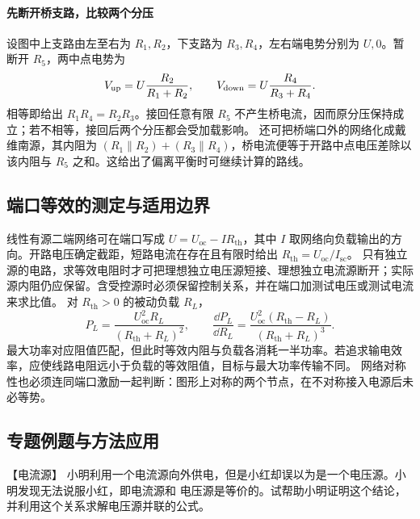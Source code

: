 {\par\noindent\begin{minipage}{\linewidth}
\bridgeFigure
{}
\end{minipage}\par\medskip


\paragraph{先断开桥支路，比较两个分压}
设图中上支路由左至右为 $R_1,R_2$，下支路为 $R_3,R_4$，左右端电势分别为 $U,0$。暂断开 $R_5$，两中点电势为
\[
 V_{\rm up}=U\frac{R_2}{R_1+R_2},\qquad
 V_{\rm down}=U\frac{R_4}{R_3+R_4}.
\]
相等即给出 $R_1R_4=R_2R_3$。接回任意有限 $R_5$ 不产生桥电流，因而原分压保持成立；若不相等，接回后两个分压都会受加载影响。
还可把桥端口外的网络化成戴维南源，其内阻为
$(R_1\parallel R_2)+(R_3\parallel R_4)$，桥电流便等于开路中点电压差除以该内阻与 $R_5$ 之和。这给出了偏离平衡时可继续计算的路线。


\subsection{端口等效的测定与适用边界}
线性有源二端网络可在端口写成 $U=U_{\mathrm{oc}}-IR_{\mathrm{th}}$，其中 $I$ 取网络向负载输出的方向。开路电压确定截距，短路电流在存在且有限时给出 $R_{\mathrm{th}}=U_{\mathrm{oc}}/I_{\mathrm{sc}}$。
只有独立源的电路，求等效电阻时才可把理想独立电压源短接、理想独立电流源断开；实际源内阻仍应保留。含受控源时必须保留控制关系，并在端口加测试电压或测试电流来求比值。
对 $R_{\mathrm{th}}>0$ 的被动负载 $R_L$，
\[
 P_L=\frac{U_{\mathrm{oc}}^2R_L}{(R_{\mathrm{th}}+R_L)^2},\qquad
 \frac{\dd P_L}{\dd R_L}=\frac{U_{\mathrm{oc}}^2(R_{\mathrm{th}}-R_L)}{(R_{\mathrm{th}}+R_L)^3}.
\]
最大功率对应阻值匹配，但此时等效内阻与负载各消耗一半功率。若追求输电效率，应使线路电阻远小于负载的等效阻值，目标与最大功率传输不同。
网络对称性也必须连同端口激励一起判断：图形上对称的两个节点，在不对称接入电源后未必等势。


\subsection{专题例题与方法应用}

\begin{origexamplebox}{【电流源】}\label{ch21:ex:s37-6-1}
小明利用一个电流源向外供电，但是小红却误以为是一个电压源。小明发现无法说服小红，即电流源和
电压源是等价的。试帮助小明证明这个结论，并利用这个关系求解电压源并联的公式。


\end{origexamplebox}}
